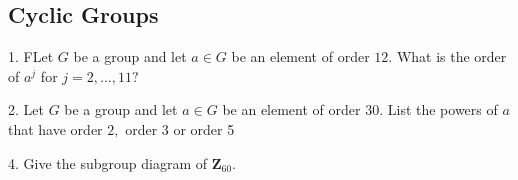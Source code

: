 \subsection{Cyclic Groups}
\begin{mdframed}[style=darkQuesion]
  1. FLet $G$ be a group and let $a \in G$ be an element of order $12 .$ What is the order of $a^{j}$ for $j=2, \ldots, 11 ?$
\end{mdframed}
\begin{mdframed}[style=darkAnswer,frametitle={Joe Starr}]
\end{mdframed}
\newpage
\begin{mdframed}[style=darkQuesion]
2. Let $G$ be a group and let $a \in G$ be an element of order $30 .$ List the powers of $a$ that have order $2,$ order 3 or order 5
\end{mdframed}
\begin{mdframed}[style=darkAnswer,frametitle={Joe Starr}]
\end{mdframed}
\newpage
\begin{mdframed}[style=darkQuesion]
4. Give the subgroup diagram of $\mathbf{Z}_{60}$.
\end{mdframed}
\begin{mdframed}[style=darkAnswer,frametitle={Joe Starr}]
\end{mdframed}
